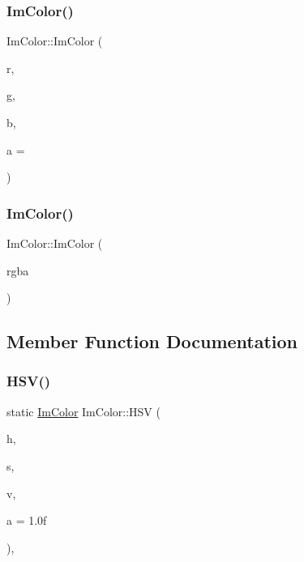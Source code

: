 \mbox{\label{structImColor_ab4ba02f8290d5dadc1ebc57b2c8a9cbe}} 
\subsubsection{\texorpdfstring{Im\+Color()}{ImColor()}\hspace{0.1cm}{\footnotesize\ttfamily [4/5]}}
{\footnotesize\ttfamily Im\+Color\+::\+Im\+Color (\begin{DoxyParamCaption}\item[{int}]{r,  }\item[{int}]{g,  }\item[{int}]{b,  }\item[{int}]{a = {} }\end{DoxyParamCaption})\hspace{0.3cm}{\ttfamily [inline]}}

\mbox{\label{structImColor_ad306332841a2b1f903f40262a19f9412}} 
\subsubsection{\texorpdfstring{Im\+Color()}{ImColor()}\hspace{0.1cm}{\footnotesize\ttfamily [5/5]}}
{\footnotesize\ttfamily Im\+Color\+::\+Im\+Color (\begin{DoxyParamCaption}\item[{Im\+U32}]{rgba }\end{DoxyParamCaption})\hspace{0.3cm}{\ttfamily [inline]}}



\subsection{Member Function Documentation}
\mbox{\label{structImColor_ac8cb52119648523038818a613becf010}} 
\subsubsection{\texorpdfstring{H\+S\+V()}{HSV()}}
{\footnotesize\ttfamily static \hyperlink{structImColor}{Im\+Color} Im\+Color\+::\+H\+SV (\begin{DoxyParamCaption}\item[{float}]{h,  }\item[{float}]{s,  }\item[{float}]{v,  }\item[{float}]{a = {\ttfamily 1.0f} }\end{DoxyParamCaption})\hspace{0.3cm}{\ttfamily [inline]}, {\ttfamily [static]}}

